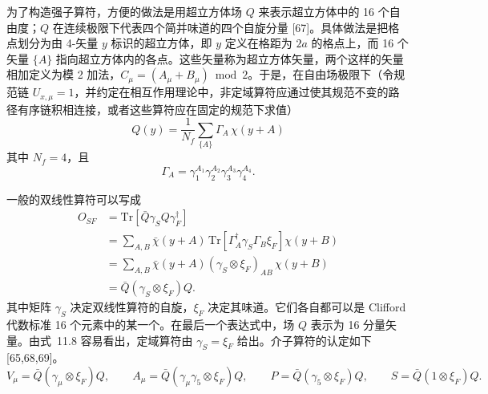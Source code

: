 为了构造强子算符，方便的做法是用超立方体场 $Q$ 来表示超立方体中的 16 个自由度；$Q$ 在连续极限下代表四个简并味道的四个自旋分量 [67]。具体做法是把格点划分为由 4-矢量 $y$ 标识的超立方体，即 $y$ 定义在格距为 $2a$ 的格点上，而 16 个矢量 $\{A\}$ 指向超立方体内的各点。这些矢量称为超立方体矢量，两个这样的矢量相加定义为模 2 加法，$C_\mu = (A_\mu + B_\mu)\bmod 2$。于是，在自由场极限下（令规范链 $U_{x,\mu} = 1$，并约定在相互作用理论中，非定域算符应通过使其规范不变的路径有序链积相连接，或者这些算符应在固定的规范下求值）
\begin{equation}
Q(y) = \frac{1}{N_f}\sum_{\{A\}}\Gamma_A\,\chi(y+A)
\label{eq:sf-hypercube-field}
\end{equation}
其中 $N_f = 4$，且
\begin{equation}
\Gamma_A = \gamma_1^{A_1}\gamma_2^{A_2}\gamma_3^{A_3}\gamma_4^{A_4} .
\label{eq:sf-gamma-A}
\end{equation}

一般的双线性算符可以写成
\begin{equation}
\begin{aligned}
O_{SF} &= \text{Tr}\left[\bar{Q}\gamma_S Q\gamma_F^\dagger\right] \\
&= \sum_{A,B}\bar{\chi}(y+A)\,\text{Tr}\left[\Gamma_A^\dagger\gamma_S\Gamma_B\xi_F\right]\chi(y+B) \\
&= \sum_{A,B}\bar{\chi}(y+A)(\gamma_S\otimes\xi_F)_{AB}\,\chi(y+B) \\
&= \bar{Q}(\gamma_S\otimes\xi_F)Q .
\end{aligned}
\label{eq:sf-bilinear}
\end{equation}
其中矩阵 $\gamma_S$ 决定双线性算符的自旋，$\xi_F$ 决定其味道。它们各自都可以是 Clifford 代数标准 16 个元素中的某一个。在最后一个表达式中，场 $Q$ 表示为 16 分量矢量。由式~11.8 容易看出，定域算符由 $\gamma_S = \xi_F$ 给出。介子算符的认定如下 [65,68,69]。
\begin{equation}
V_\mu = \bar{Q}(\gamma_\mu\otimes\xi_F)Q, \qquad
A_\mu = \bar{Q}(\gamma_\mu\gamma_5\otimes\xi_F)Q, \qquad
P = \bar{Q}(\gamma_5\otimes\xi_F)Q, \qquad
S = \bar{Q}(1\otimes\xi_F)Q .
\label{eq:sf-mesons}
\end{equation}

